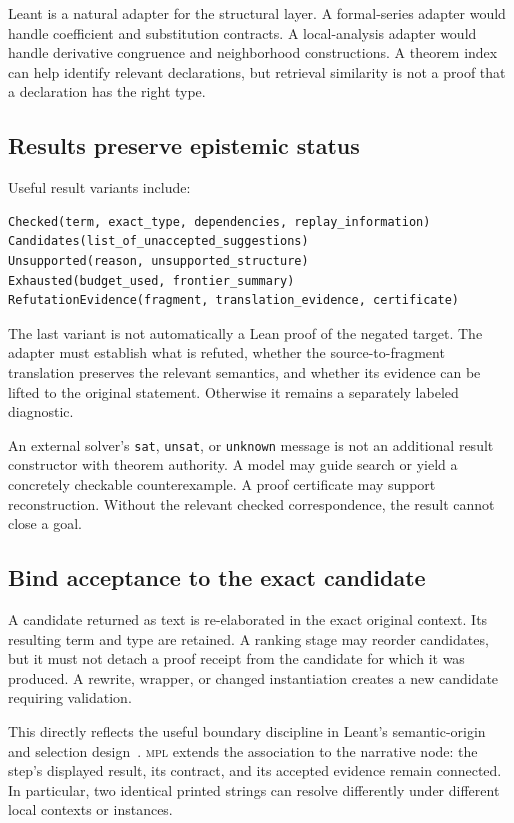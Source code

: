 \documentclass[11pt,a4paper]{article}
\newcommand{\MPL}{\textnormal{\textsc{mpl}}}
\newcommand{\code}[1]{\texttt{#1}}
\theoremstyle{remark}
\begin{document}
Leant is a natural adapter for the structural layer. A formal-series adapter would handle coefficient and substitution contracts. A local-analysis adapter would handle derivative congruence and neighborhood constructions. A theorem index can help identify relevant declarations, but retrieval similarity is not a proof that a declaration has the right type.

\subsection{Results preserve epistemic status}

Useful result variants include:
\begin{lstlisting}
Checked(term, exact_type, dependencies, replay_information)
Candidates(list_of_unaccepted_suggestions)
Unsupported(reason, unsupported_structure)
Exhausted(budget_used, frontier_summary)
RefutationEvidence(fragment, translation_evidence, certificate)
\end{lstlisting}
The last variant is not automatically a Lean proof of the negated target. The adapter must establish what is refuted, whether the source-to-fragment translation preserves the relevant semantics, and whether its evidence can be lifted to the original statement. Otherwise it remains a separately labeled diagnostic.

An external solver's \code{sat}, \code{unsat}, or \code{unknown} message is not an additional result constructor with theorem authority. A model may guide search or yield a concretely checkable counterexample. A proof certificate may support reconstruction. Without the relevant checked correspondence, the result cannot close a goal.

\subsection{Bind acceptance to the exact candidate}

A candidate returned as text is re-elaborated in the exact original context. Its resulting term and type are retained. A ranking stage may reorder candidates, but it must not detach a proof receipt from the candidate for which it was produced. A rewrite, wrapper, or changed instantiation creates a new candidate requiring validation.

This directly reflects the useful boundary discipline in Leant's semantic-origin and selection design~\cite{leant-internals,leant-selection}. \MPL{} extends the association to the narrative node: the step's displayed result, its contract, and its accepted evidence remain connected. In particular, two identical printed strings can resolve differently under different local contexts or instances.
\end{document}
